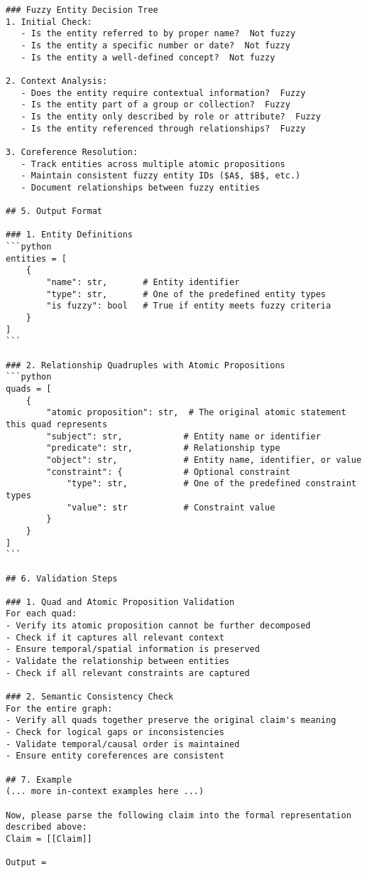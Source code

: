 \begin{lstlisting}[caption=Claim Graph Construction Prompt, label={lst:claim_graph}]
### Fuzzy Entity Decision Tree
1. Initial Check:
   - Is the entity referred to by proper name?  Not fuzzy
   - Is the entity a specific number or date?  Not fuzzy
   - Is the entity a well-defined concept?  Not fuzzy

2. Context Analysis:
   - Does the entity require contextual information?  Fuzzy
   - Is the entity part of a group or collection?  Fuzzy
   - Is the entity only described by role or attribute?  Fuzzy
   - Is the entity referenced through relationships?  Fuzzy

3. Coreference Resolution:
   - Track entities across multiple atomic propositions
   - Maintain consistent fuzzy entity IDs ($A$, $B$, etc.)
   - Document relationships between fuzzy entities

## 5. Output Format

### 1. Entity Definitions
```python
entities = [
    {
        "name": str,       # Entity identifier 
        "type": str,       # One of the predefined entity types
        "is fuzzy": bool   # True if entity meets fuzzy criteria
    }
]
```

### 2. Relationship Quadruples with Atomic Propositions
```python
quads = [
    {
        "atomic proposition": str,  # The original atomic statement this quad represents
        "subject": str,            # Entity name or identifier
        "predicate": str,          # Relationship type
        "object": str,             # Entity name, identifier, or value
        "constraint": {            # Optional constraint
            "type": str,           # One of the predefined constraint types
            "value": str           # Constraint value
        }
    }
]
```

## 6. Validation Steps

### 1. Quad and Atomic Proposition Validation
For each quad:
- Verify its atomic proposition cannot be further decomposed
- Check if it captures all relevant context
- Ensure temporal/spatial information is preserved
- Validate the relationship between entities
- Check if all relevant constraints are captured

### 2. Semantic Consistency Check
For the entire graph:
- Verify all quads together preserve the original claim's meaning
- Check for logical gaps or inconsistencies
- Validate temporal/causal order is maintained
- Ensure entity coreferences are consistent

## 7. Example 
(... more in-context examples here ...)

Now, please parse the following claim into the formal representation described above:
Claim = [[Claim]]

Output =

\end{lstlisting}
